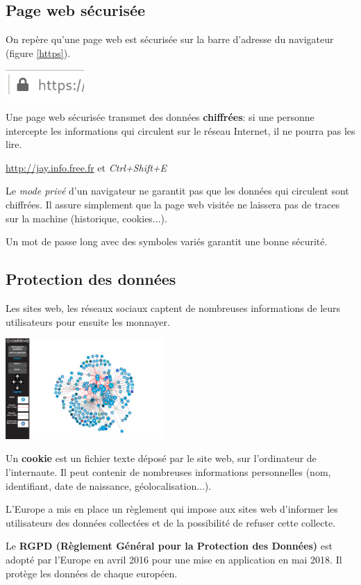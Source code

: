 \documentclass[a4paper,11pt]{article}
\begin{document}
\begin{Form}
\subsection{Page web sécurisée}
On repère qu'une page web est sécurisée sur la barre d'adresse du navigateur (figure \ref{https}).
\begin{center}
\centering
\includegraphics[width=3cm]{ressources/https.png}
\label{https}
\end{center}
\begin{aretenir}[]
Une page web sécurisée transmet des données \textbf{chiffrées}: si une personne intercepte les informations qui circulent sur le réseau Internet, il ne pourra pas les lire.
\end{aretenir}
\begin{commentprof}
\url{http://jay.info.free.fr} et \emph{Ctrl+Shift+E}
\end{commentprof}
Le \emph{mode privé} d'un navigateur ne garantit pas que les données qui circulent sont chiffrées. Il assure simplement que la page web visitée ne laissera pas de traces sur la machine (historique, cookies...).
\begin{aretenir}[]
Un mot de passe long avec des symboles variés garantit une bonne sécurité.
\end{aretenir}
\subsection{Protection des données}
Les sites web, les réseaux sociaux captent de nombreuses informations de leurs utilisateurs pour ensuite les monnayer.
\begin{center}
\centering
\includegraphics[width=6cm]{ressources/cookieviz.png}
\label{cookieviz}
\end{center}
\begin{aretenir}[]
Un \textbf{cookie} est un fichier texte déposé par le site web, sur l'ordinateur de l'internaute. Il peut contenir de nombreuses informations personnelles (nom, identifiant, date de naissance, géolocalisation...).
\end{aretenir}
L'Europe a mis en place un règlement qui impose aux sites web d'informer les utilisateurs des données collectées et de la possibilité de refuser cette collecte.
\begin{aretenir}[]
Le \textbf{RGPD (Règlement Général pour la Protection des Données)} est adopté par l'Europe en avril 2016 pour une mise en application en mai 2018. Il protège les données de chaque européen.
\end{aretenir}
\end{Form}
\end{document}
